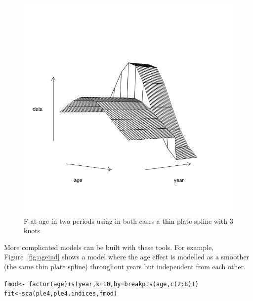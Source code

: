 \documentclass[a4paper,english,10pt]{article}\usepackage[]{graphicx}\usepackage[]{color}
\makeatletter
\newcommand{\hlnum}[1]{\textcolor[rgb]{0.063,0.58,0.627}{#1}}%
\newcommand{\hlopt}[1]{\textcolor[rgb]{0.196,0.196,0.196}{#1}}%
\newcommand{\hlstd}[1]{\textcolor[rgb]{0.196,0.196,0.196}{#1}}%
\newcommand{\hlkwb}[1]{\textcolor[rgb]{0.627,0,0.314}{#1}}%
\newcommand{\hlkwc}[1]{\textcolor[rgb]{0,0.631,0.314}{#1}}%
\newcommand{\hlkwd}[1]{\textcolor[rgb]{0.78,0.227,0.412}{#1}}%
\newenvironment{kframe}{%
 \def\at@end@of@kframe{}%
 \ifinner\ifhmode%
  \def\at@end@of@kframe{\end{minipage}}%
  \begin{minipage}{\columnwidth}%
 \fi\fi%
 \def\FrameCommand##1{\hskip\@totalleftmargin \hskip-\fboxsep
 \colorbox{shadecolor}{##1}\hskip-\fboxsep
     \hskip-\linewidth \hskip-\@totalleftmargin \hskip\columnwidth}%
 \MakeFramed {\advance\hsize-\width
   \@totalleftmargin\z@ \linewidth\hsize
   \@setminipage}}%
 {\par\unskip\endMakeFramed%
 \at@end@of@kframe}
\newenvironment{knitrout}{}{} %
\makeatother
\begin{document}
\begin{knitrout}
\color{fgcolor}\begin{figure}[H]

{\centering \includegraphics[width=.9\linewidth]{figure/brk-1} 

}

\caption[F-at-age in two periods using in both cases a thin plate spline with 3 knots]{F-at-age in two periods using in both cases a thin plate spline with 3 knots}\label{fig:brk}
\end{figure}


\end{knitrout}

More complicated models can be built with these tools. For example, Figure~\ref{fig:ageind} shows a model where the age effect is modelled as a smoother (the same thin plate spline) throughout years but independent from each other.

\begin{knitrout}
\color{fgcolor}\begin{kframe}
\begin{alltt}
\hlstd{fmod} \hlkwb{<-} \hlopt{~}\hlkwd{factor}\hlstd{(age)} \hlopt{+} \hlkwd{s}\hlstd{(year,} \hlkwc{k} \hlstd{=} \hlnum{10}\hlstd{,} \hlkwc{by} \hlstd{=} \hlkwd{breakpts}\hlstd{(age,} \hlkwd{c}\hlstd{(}\hlnum{2}\hlopt{:}\hlnum{8}\hlstd{)))}
\hlstd{fit} \hlkwb{<-} \hlkwd{sca}\hlstd{(ple4, ple4.indices, fmod)}
\end{alltt}
\end{kframe}
\end{knitrout}
\end{document}
